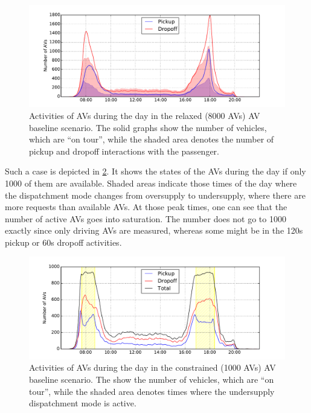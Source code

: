 \begin{figure}
    \centering
    \includegraphics[width=1.0\textwidth]{figures/avwork.pdf}
    \caption{Activities of AVs during the day in the relaxed (8000 AVs) AV baseline scenario.
    The solid graphs show the number of vehicles, which are ``on tour'', while the
    shaded area denotes the number of pickup and dropoff interactions with the
    passenger.}
    \label{fig:avwork}
\end{figure}

Such a case is depicted in \cref{fig:avwork_low}. It shows the states of the AVs during the day
if only 1000 of them are available. Shaded areas
indicate those times of the day where the dispatchment mode changes from
oversupply to undersupply, where there are more requests than available AVs. At those
peak times, one
can see that the number of active AVs goes into saturation. The number does not
go to 1000 exactly since only driving AVs are measured, whereas some might be in
the 120s pickup or 60s dropoff activities.

\begin{figure}
    \centering
    \includegraphics[width=1.0\textwidth]{figures/avwork_low.pdf}
    \caption{Activities of AVs during the day in the constrained (1000 AVs) AV baseline scenario.
    The show the number of vehicles, which are ``on tour'', while the
    shaded area denotes times where the undersupply dispatchment mode is active.}
    \label{fig:avwork_low}
\end{figure}


